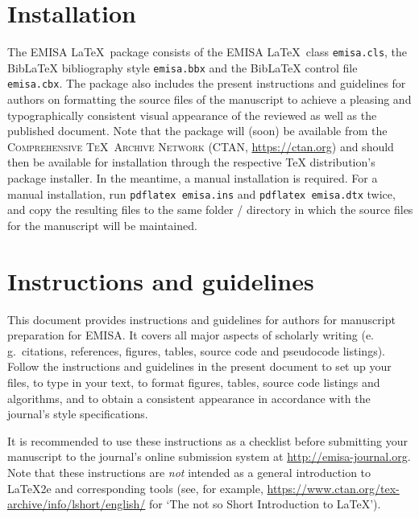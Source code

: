 \documentclass[a4paper]{ltxdoc}
\begin{document}
\section{Installation}
The EMISA \LaTeX\ package consists of the EMISA \LaTeX\ class \texttt{emisa.cls}, the BibLaTeX bibliography style \texttt{emisa.bbx} and the BibLaTeX control file \texttt{emisa.cbx}. 
The package also includes the present instructions and guidelines for authors on formatting the source files of the manuscript to achieve a pleasing and typographically consistent visual appearance of the reviewed as well as the published document.
Note that the package will (soon) be available from the \textsc{Comprehensive \TeX\ Archive Network} (CTAN, \url{https://ctan.org}) and should then be available for installation through the respective \TeX{} distribution’s package installer. In the meantime, a manual installation is required. For a manual installation, run \verb|pdflatex emisa.ins| and \verb|pdflatex emisa.dtx| twice, and copy the resulting files to the same folder / directory in which the source files for the manuscript will be maintained. 





\section{Instructions and guidelines}
This document provides instructions and guidelines for authors for manuscript preparation for EMISA. 
It covers all major aspects of scholarly writing (e.\,g.\ citations, references, figures, tables, source code and pseudocode listings).
Follow the instructions and guidelines in the present document to set up your files, to type in your text, to format figures, tables, source code listings and algorithms, and to obtain a consistent appearance in accordance with the journal's style specifications. 

It is recommended to use these instructions as a checklist before submitting your manuscript to the journal's online submission system at \url{http://emisa-journal.org}.
Note that these instructions are \emph{not} intended as a general introduction to \LaTeX2e{} and corresponding tools (see, for example, \url{https://www.ctan.org/tex-archive/info/lshort/english/} for ‘The not so Short Introduction to LaTeX’). 

\end{document}
